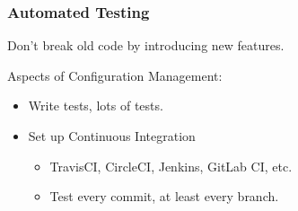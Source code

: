 \begin{frame}

\frametitle{Automated Testing}

\begin{center}

Don't break old code by introducing new features.

\end{center}

\vspace{\fill}

\footnotesize

Aspects of Configuration Management:

\begin{itemize}

\item Write tests, lots of tests.

\item Set up Continuous Integration

\footnotesize

\begin{itemize}

\item TravisCI, CircleCI, Jenkins, GitLab CI, etc.

\item Test every commit, at least every branch.

\end{itemize}

\end{itemize}

\end{frame}
